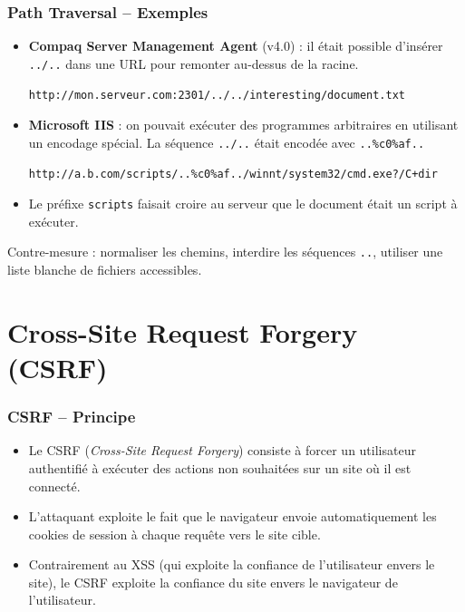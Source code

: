 \documentclass{beamer}
\def\emptyline{\vspace{10pt}}
\begin{document}
\begin{frame}
\frametitle{Path Traversal -- Exemples}

\begin{itemize}
\item \textbf{Compaq Server Management Agent} (v4.0) : il était possible d'insérer \texttt{../..} dans une URL pour remonter au-dessus de la racine.
\begin{center}\begin{scriptsize}
\texttt{http://mon.serveur.com:2301/../../interesting/document.txt}
\end{scriptsize}\end{center}

\item \textbf{Microsoft IIS} : on pouvait exécuter des programmes arbitraires en utilisant un encodage spécial. La séquence \texttt{../..} était encodée avec \texttt{..\%c0\%af..}
\begin{center}\begin{scriptsize}
\texttt{http://a.b.com/scripts/..\%c0\%af../winnt/system32/cmd.exe?/C+dir}
\end{scriptsize}\end{center}

\item Le préfixe \texttt{scripts} faisait croire au serveur que le document était un script à exécuter.
\end{itemize}

\emptyline
\alert{Contre-mesure} : normaliser les chemins, interdire les séquences \texttt{..}, utiliser une liste blanche de fichiers accessibles.
\end{frame}


\section{Cross-Site Request Forgery (CSRF)}

\begin{frame}
\frametitle{CSRF -- Principe}

\begin{itemize}
\item Le CSRF (\textit{Cross-Site Request Forgery}) consiste à forcer un utilisateur authentifié à \alert{exécuter des actions non souhaitées} sur un site où il est connecté.
\item L'attaquant exploite le fait que le navigateur envoie automatiquement les cookies de session à chaque requête vers le site cible.
\item Contrairement au XSS (qui exploite la confiance de l'utilisateur envers le site), le CSRF exploite la \alert{confiance du site envers le navigateur} de l'utilisateur.
\end{itemize}
\end{frame}
\end{document}
